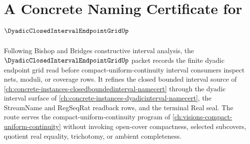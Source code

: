 \chapter{A Concrete Naming Certificate for $\DyadicClosedIntervalEndpointGridUp$}
\label{ch:concrete-instances-dyadic-closed-interval-endpoint-grid-namecert}

Following Bishop and Bridges constructive interval analysis, the $\DyadicClosedIntervalEndpointGridUp$ packet records the finite dyadic endpoint grid read before compact-uniform-continuity interval consumers inspect nets, moduli, or coverage rows. It refines the closed bounded interval source of \autoref{ch:concrete-instances-closedboundedinterval-namecert} through the dyadic interval surface of \autoref{ch:concrete-instances-dyadicinterval-namecert}, the StreamName and RegSeqRat readback rows, and the terminal Real seal. The route serves the compact-uniform-continuity program of \autoref{ch:visions-compact-uniform-continuity} without invoking open-cover compactness, selected subcovers, quotient real equality, trichotomy, or ambient completeness.

